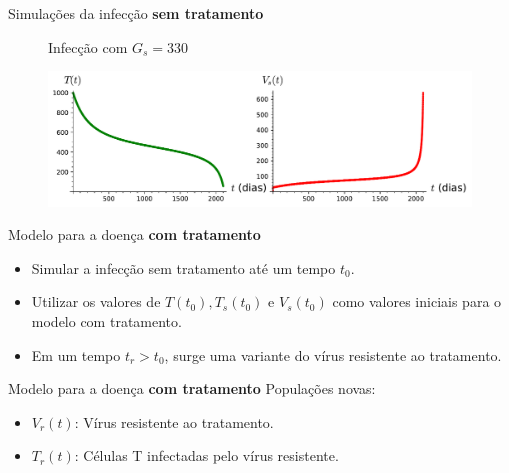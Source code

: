 \documentclass[13pt]{beamer}
\begin{document}
\begin{frame}{Simulações da infecção \textbf{sem tratamento}}
    \begin{figure}[htb]
        Infecção com \( G_{ s } = 330 \)
        \begin{center}
            \includegraphics[width=\textwidth]{../figuras/cenario_3.pdf}
        \end{center}
    \end{figure}
\end{frame}

\begin{frame}{Modelo para a doença \textbf{com tratamento}}
    \begin{itemize}
        \item<1-> Simular a infecção sem tratamento até um tempo \( t_{ 0 } \).
        \item<2-> Utilizar os valores de \( T ( t_{ 0 } ), T_{ s } ( t_{ 0 } ) \) e \( V_{ s } ( t_{ 0 } ) \) como valores iniciais para o modelo com tratamento.
        \item<3-> Em um tempo \( t_{ r } > t_{ 0 } \), surge uma variante do vírus resistente ao tratamento.
    \end{itemize}
\end{frame}

\begin{frame}{Modelo para a doença \textbf{com tratamento}}
    Populações novas:
    \begin{itemize}
        \item<1-> \( V_{ r } ( t ) \): Vírus resistente ao tratamento.
        \item<2-> \( T_{ r } ( t ) \): Células T infectadas pelo vírus resistente.
    \end{itemize}
\end{frame}
\end{document}
